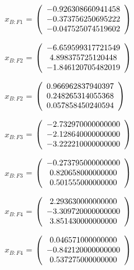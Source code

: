 \begin{description}
$\hat{x}_{B:F1}$  = $\left( \begin{array} {ccc} -0.926308660941458 \\ -0.373756250695222 \\ -0.047525074519602
\end{array} \right)\\ \\$

$x_{B:F2}$  = $\left( \begin{array} {ccc} -6.659599317721549 \\ 4.898375725120448 \\ -1.846120705482019
\end{array} \right)\\ \\$

$\hat{x}_{B:F2}$  = $\left( \begin{array} {ccc} 0.966962837940397 \\ 0.248265314055368 \\ 0.057858450240594
\end{array} \right)\\ \\$

$x_{B:F3}$  = $\left( \begin{array} {ccc} -2.732970000000000 \\ -2.128640000000000 \\ -3.222210000000000
\end{array} \right)\\ \\$

$\hat{x}_{B:F3}$  = $\left( \begin{array} {ccc} -0.273795000000000 \\ 0.820658000000000 \\ 0.501555000000000
\end{array} \right)\\ \\$

$x_{B:F4}$  = $\left( \begin{array} {ccc} 2.293630000000000 \\ -3.309720000000000 \\ 3.851430000000000
\end{array} \right)\\ \\$

$\hat{x}_{B:F4}$  = $\left( \begin{array} {ccc} 0.046571000000000 \\ -0.842120000000000 \\ 0.537275000000000
\end{array} \right)\\ \\$


\end{description}
